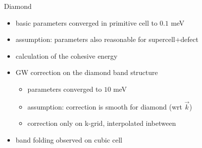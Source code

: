 \documentclass[fontsize=9pt]{beamer}
\begin{document}
\begin{frame}{Diamond}
    \begin{itemize}
        \item basic parameters converged in primitive cell to $0.1$ meV
        \item assumption: parameters also reasonable for supercell+defect
        \item calculation of the cohesive energy
        \item GW correction on the diamond band structure
        \begin{itemize}
            \item parameters converged to $10$ meV
            \item assumption: correction is smooth for diamond (wrt $\vec{k}$)
            \item correction only on k-grid, interpolated inbetween
        \end{itemize}
        \item band folding observed on cubic cell
    \end{itemize}
\end{frame}
\end{document}

